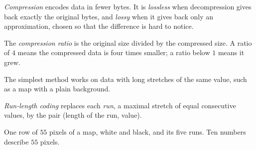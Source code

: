 \begin{definition}\label{def:g10:images-sound-compression:compression}
\emph{Compression} encodes data in fewer bytes. It is \emph{lossless} when
decompression gives back exactly the original bytes, and \emph{lossy} when it gives back only an
approximation, chosen so that the difference is hard to notice.
\end{definition}

\begin{definition}\label{def:g10:images-sound-compression:ratio}
The \emph{compression ratio} is the original size divided by the compressed size. A ratio of
$4$ means the compressed data is four times smaller; a ratio below $1$ means it grew.
\end{definition}

The simplest  method works on data with long stretches of the same value, such as a map with a plain
background.

\begin{definition}\label{def:g10:images-sound-compression:rle}
\emph{Run-length coding} replaces each \emph{run}, a maximal stretch of equal consecutive
values, by the pair (length of the run, value).
\end{definition}

\begin{omfigure}

{\small One row of $55$ pixels of a map, white and black, and its five runs. Ten numbers describe $55$ pixels.}
\end{omfigure}

\label{lst:g10:images-sound-compression:rle}

